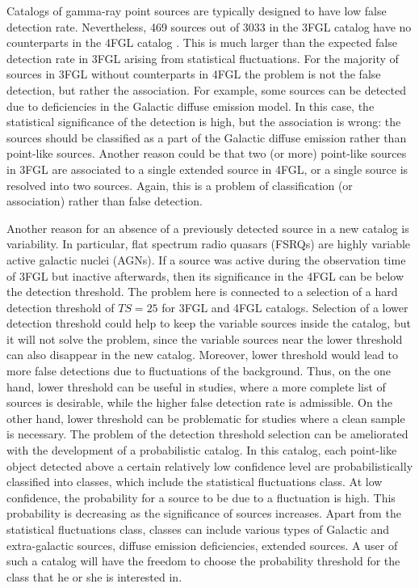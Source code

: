 Catalogs of gamma-ray point sources are typically designed to have low false detection rate. 
Nevertheless, 469 sources out of 3033 in the 3FGL catalog \citep{2015ApJS..218...23A} have no counterparts 
in the 4FGL catalog \citep{2020ApJS..247...33A}.
This is much larger than the expected false detection rate in 3FGL arising from statistical fluctuations.
For the majority of sources in 3FGL without counterparts in 4FGL the problem is not the false detection, 
but rather the association.
For example, some sources can be detected due to deficiencies in the Galactic diffuse emission model.
In this case, the statistical significance of the detection is high, but the association is wrong: the sources should be classified as
a part of the Galactic diffuse emission rather than point-like sources.
Another reason could be that two (or more) point-like sources in 3FGL are associated to a single extended source in 4FGL,
or a single source is resolved into two sources.
Again, this is a problem of classification (or association) rather than false detection.

Another reason for an absence of a previously detected source in a new catalog is variability.
In particular, flat spectrum radio quasars (FSRQs) are highly variable active galactic nuclei (AGNs).
If a source was active during the observation time of 3FGL but inactive afterwards, 
then its significance in the 4FGL can be below the detection threshold.
The problem here is connected to a selection of a hard detection threshold of $TS = 25$ for 3FGL and 4FGL catalogs.
Selection of a lower detection threshold could help to keep the variable sources inside the catalog, 
but it will not solve the problem, since the variable sources near the lower threshold can also disappear in the new catalog.
Moreover, lower threshold would lead to more false detections due to fluctuations of the background.
Thus, on the one hand, lower threshold can be useful in studies, where a more complete list of sources is desirable,
while the higher false detection rate is admissible. On the other hand, lower threshold can be problematic for studies where 
a clean sample is necessary. 
The problem of the detection threshold selection can be ameliorated with the development of a probabilistic catalog.
In this catalog, each point-like object detected above a certain relatively low confidence level
are probabilistically classified into classes, which include the statistical fluctuations class.
At low confidence, the probability for a source to be due to a fluctuation is high.
This probability is decreasing as the significance of sources increases.
Apart from the statistical fluctuations class, classes can include various types of Galactic and extra-galactic sources, diffuse emission deficiencies, extended sources.
A user of such a catalog will have the freedom to choose the probability threshold for the class that he or she is interested in.








